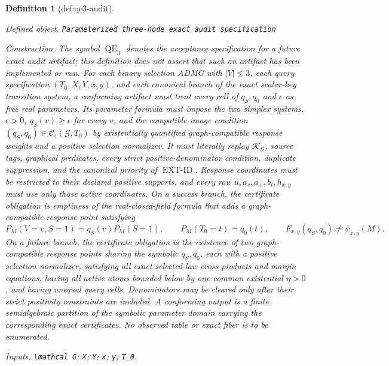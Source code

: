\documentclass{article}
\newtheorem{definition}{Definition}
\begin{document}
\begin{definition}[def:qe3-audit]\label{def:qe3-audit}
\par\smallskip\noindent\emph{Defined object.} \texttt{Parameterized three-\allowbreak{}node exact audit specification}
\par\smallskip\noindent\emph{Construction.} The symbol \(\operatorname{QE}_3\) denotes the acceptance specification for a future exact audit artifact; this definition does not assert that such an artifact has been implemented or run.  For each binary selection ADMG with \(\lvert V\rvert\leq 3\), each query specification \((T_0,X,Y,x,y)\), and each canonical branch of the exact scalar-key transition system, a conforming artifact must treat every cell of \(q_S,q_0\) and \(\epsilon\) as free real parameters.  Its parameter formula must impose the two simplex systems, \(\epsilon>0\), \(q_S(v)\geq\epsilon\) for every \(v\), and the compatible-image condition \((q_S,q_0)\in\mathcal C_{\epsilon}(\mathcal G,T_0)\) by existentially quantified graph-compatible response weights and a positive selection normalizer.  It must literally replay \(\mathscr K_{\mathcal G}\), source tags, graphical predicates, every strict positive-denominator condition, duplicate suppression, and the canonical priority of \(\operatorname{EXT\text{-}ID}\).  Response coordinates must be restricted to their declared positive supports, and every row \(u,a_v,a_+,b_t,h_{x,y}\) must use only those active coordinates.  On a success branch, the certificate obligation is emptiness of the real-closed-field formula that adds a graph-compatible response point satisfying
\[
 P_M(V=v,S=1)=q_S(v)P_M(S=1),\qquad
 P_M(T_0=t)=q_0(t),\qquad
 F_{x,y}(q_S,q_0)\neq\psi_{x,y}(M).
\]
On a failure branch, the certificate obligation is the existence of two graph-compatible response points sharing the symbolic \(q_S,q_0\), each with a positive selection normalizer, satisfying all exact selected-law cross-products and margin equations, having all active atoms bounded below by one common existential \(\eta>0\), and having unequal query cells.  Denominators may be cleared only after their strict positivity constraints are included.  A conforming output is a finite semialgebraic partition of the symbolic parameter domain carrying the corresponding exact certificates.  No observed table or exact fiber is to be enumerated.
\par\smallskip\noindent\emph{Inputs.} \texttt{\textbackslash{}\allowbreak{}mathcal G}; \texttt{X}; \texttt{Y}; \texttt{x}; \texttt{y}; \texttt{T\_\allowbreak{}0}.
\end{definition}
\end{document}
